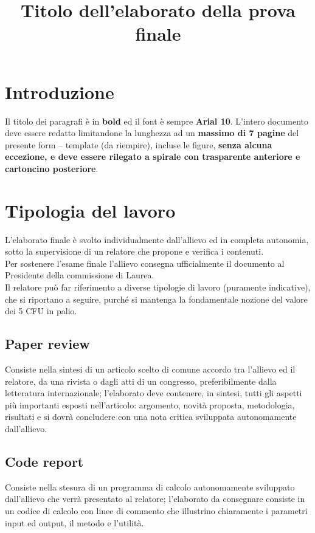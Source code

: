 \documentclass{baer}
\title{Titolo dell'elaborato della prova finale}
\begin{document}
\maketitle

\section{Introduzione}



Il titolo dei paragrafi è in \textbf{bold} ed il font è sempre \textbf{Arial 10}.
L’intero documento deve essere redatto limitandone la
lunghezza ad un \textbf{massimo di 7 pagine} del presente form
– template (da riempire), incluse le figure, \textbf{senza alcuna
eccezione, e deve essere rilegato a spirale con trasparente anteriore e cartoncino posteriore}.

\section{Tipologia del lavoro}

L’elaborato finale è svolto individualmente dall’allievo ed
in completa autonomia, sotto la supervisione di un
relatore che propone e verifica i contenuti.\\
Per sostenere l’esame finale l’allievo consegna
ufficialmente il documento al Presidente della
commissione di Laurea.\\
Il relatore può far riferimento a diverse tipologie di lavoro
(puramente indicative), che si riportano a seguire, purché
si mantenga la fondamentale nozione del valore dei 5
CFU in palio.

\subsection{Paper review}
Consiste nella sintesi di un articolo scelto di comune
accordo tra l’allievo ed il relatore, da una rivista o dagli
atti di un congresso, preferibilmente dalla letteratura
internazionale; l’elaborato deve contenere, in sintesi, tutti
gli aspetti più importanti esposti nell’articolo: argomento,
novità proposta, metodologia, risultati e si dovrà
concludere con una nota critica sviluppata
autonomamente dall’allievo.

\subsection{Code report}
Consiste nella stesura di un programma di calcolo
autonomamente sviluppato dall’allievo che verrà
presentato al relatore; l’elaborato da consegnare consiste
in un codice di calcolo con linee di commento che
illustrino chiaramente i parametri input ed output, il
metodo e l’utilità.
\end{document}

